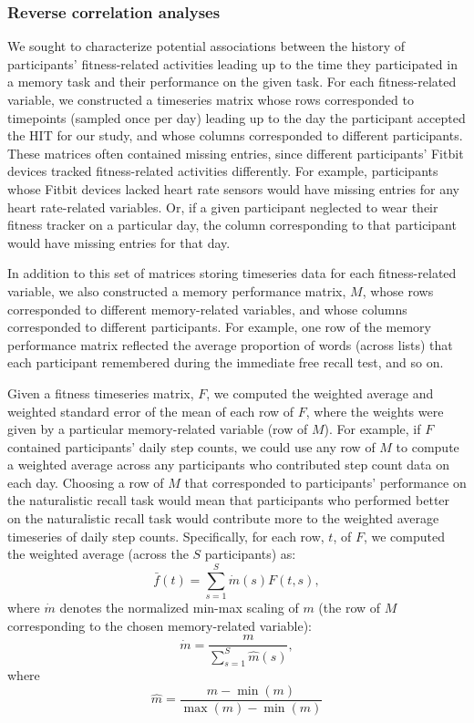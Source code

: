 \documentclass[10pt]{article}
\begin{document}
\subsubsection*{Reverse correlation analyses}
We sought to characterize potential associations between the history
of participants' fitness-related activities leading up to the time
they participated in a memory task and their performance on the given
task.  For each fitness-related variable, we constructed a timeseries
matrix whose rows corresponded to timepoints (sampled once per day)
leading up to the day the participant accepted the HIT for our study,
and whose columns corresponded to different participants.  These
matrices often contained missing entries, since different
participants' Fitbit devices tracked fitness-related activities
differently.  For example, participants whose Fitbit devices lacked
heart rate sensors would have missing entries for any heart
rate-related variables.  Or, if a given participant neglected to wear
their fitness tracker on a particular day, the column corresponding to
that participant would have missing entries for that day.

In addition to this set of matrices storing timeseries data for each
fitness-related variable, we also constructed a memory performance
matrix, $M$, whose rows corresponded to different memory-related
variables, and whose columns corresponded to different participants.
For example, one row of the memory performance matrix reflected the
average proportion of words (across lists) that each participant
remembered during the immediate free recall test, and so on.

Given a fitness timeseries matrix, $F$, we computed the weighted
average and weighted standard error of the mean of each row of $F$,
where the weights were given by a particular memory-related variable
(row of $M$).  For example, if $F$ contained participants' daily step
counts, we could use any row of $M$ to compute a weighted average
across any participants who contributed step count data on each day.
Choosing a row of $M$ that corresponded to participants' performance
on the naturalistic recall task would mean that participants who
performed better on the naturalistic recall task would contribute more
to the weighted average timeseries of daily step counts.
Specifically, for each row, $t$, of $F$, we computed the weighted
average (across the $S$ participants) as:
\[
\bar{f}(t) = \sum_{s=1}^S \dot{m}(s) F(t, s),
\]
where $\dot{m}$ denotes the normalized min-max scaling of $m$ (the row
of $M$ corresponding to the chosen memory-related variable):
\[
  \dot{m} = \frac{m}{\sum_{s=1}^S \hat{m}(s)},
\]
where
\[
  \hat{m} = \frac{m - \min(m)}{\max(m) - \min(m)}
\]
\end{document}
